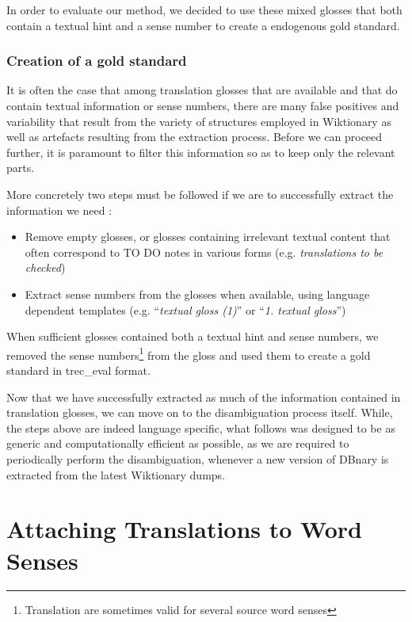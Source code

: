 \documentclass[10pt, a4paper]{article}
\begin{document}
In order to evaluate our method, we decided to use these mixed glosses that both contain a textual hint and a sense number to create a endogenous gold standard.

\subsubsection{Creation of a gold standard}

It is often the case that among translation glosses that are available and that do contain textual information or sense numbers, there are many false positives and variability that result from the variety of structures employed in Wiktionary as well as artefacts resulting from the extraction process. Before we can proceed further, it is paramount to filter this information so as to keep only the relevant parts. 

More concretely two steps must be followed if we are to successfully extract the information we need :
\begin{itemize}
   \item Remove empty glosses, or glosses containing irrelevant textual content that often correspond to TO DO notes in various forms (e.g. \emph{translations to be checked})
   \item Extract sense numbers from the glosses when available, using language dependent templates (e.g. ``\emph{textual gloss (1)}'' or ``\emph{1. textual gloss}'') 
\end{itemize}

When sufficient glosses contained both a textual hint and sense numbers, we removed the sense numbers\footnote{Translation are sometimes valid for several source word senses} from the gloss and used them to create a gold standard in trec\_eval format.

Now that we have successfully extracted as much of the information contained in translation glosses, we can move on to the disambiguation process itself. While, the steps above are indeed language specific, what follows was designed to be as generic and computationally efficient as possible, as we are required to periodically perform the disambiguation, whenever a new version of DBnary is extracted from the latest Wiktionary dumps.



\section{Attaching Translations to Word Senses}
\end{document}

